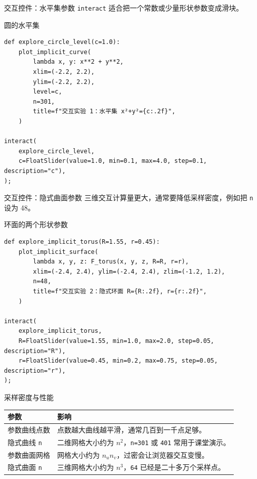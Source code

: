 \documentclass[aspectratio=169,11pt]{ctexbeamer}
\begin{document}
\begin{frame}[fragile]{交互控件：水平集参数}
  \texttt{interact} 适合把一个常数或少量形状参数变成滑块。

  \begin{block}{圆的水平集}
\begin{Verbatim}[fontsize=\tiny]
def explore_circle_level(c=1.0):
    plot_implicit_curve(
        lambda x, y: x**2 + y**2,
        xlim=(-2.2, 2.2),
        ylim=(-2.2, 2.2),
        level=c,
        n=301,
        title=f"交互实验 1：水平集 x²+y²={c:.2f}",
    )

interact(
    explore_circle_level,
    c=FloatSlider(value=1.0, min=0.1, max=4.0, step=0.1, description="c"),
);
\end{Verbatim}
  \end{block}
\end{frame}

\begin{frame}[fragile]{交互控件：隐式曲面参数}
  三维交互计算量更大，通常要降低采样密度，例如把 \texttt{n} 设为 48。

  \begin{block}{环面的两个形状参数}
\begin{Verbatim}[fontsize=\tiny]
def explore_implicit_torus(R=1.55, r=0.45):
    plot_implicit_surface(
        lambda x, y, z: F_torus(x, y, z, R=R, r=r),
        xlim=(-2.4, 2.4), ylim=(-2.4, 2.4), zlim=(-1.2, 1.2),
        n=48,
        title=f"交互实验 2：隐式环面 R={R:.2f}, r={r:.2f}",
    )

interact(
    explore_implicit_torus,
    R=FloatSlider(value=1.55, min=1.0, max=2.0, step=0.05, description="R"),
    r=FloatSlider(value=0.45, min=0.2, max=0.75, step=0.05, description="r"),
);
\end{Verbatim}
  \end{block}
\end{frame}

\begin{frame}{采样密度与性能}
  \begin{tabularx}{\linewidth}{@{}lX@{}}
    \toprule
    参数 & 影响 \\
    \midrule
    参数曲线点数 & 点数越大曲线越平滑，通常几百到一千点足够。 \\
    隐式曲线 \texttt{n} & 二维网格大小约为 \(n^2\)，\texttt{n=301} 或 \texttt{401} 常用于课堂演示。 \\
    参数曲面网格 & 网格大小约为 \(n_u n_v\)，过密会让浏览器交互变慢。 \\
    隐式曲面 \texttt{n} & 三维网格大小约为 \(n^3\)，\texttt{64} 已经是二十多万个采样点。 \\
    \bottomrule
  \end{tabularx}
\end{frame}
\end{document}
